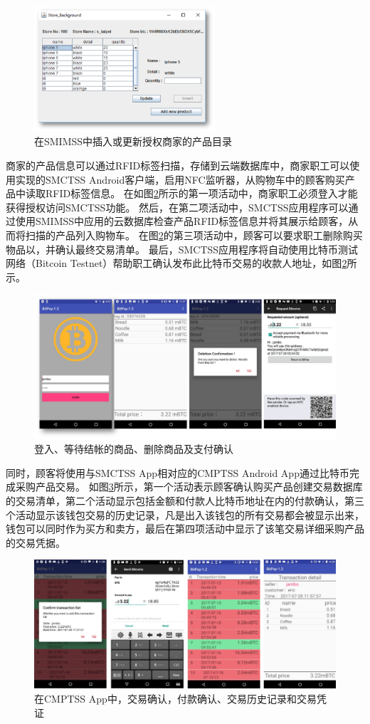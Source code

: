 \begin{figure}[!htbp]
	\centering
	\includegraphics[width = 0.6\textwidth]{fig6.png}
	\caption{在SMIMSS中插入或更新授权商家的产品目录}\label{fig6}
\end{figure}

商家的产品信息可以通过RFID标签扫描，存储到云端数据库中，商家职工可以使用实现的SMCTSS Android客户端，启用NFC监听器，从购物车中的顾客购买产品中读取RFID标签信息。 在如图\ref{fig7}所示的第一项活动中，商家职工必须登入才能获得授权访问SMCTSS功能。 然后，在第二项活动中，SMCTSS应用程序可以通过使用SMIMSS中应用的云数据库检查产品RFID标签信息并将其展示给顾客，从而将扫描的产品列入购物车。 在图\ref{fig7}的第三项活动中，顾客可以要求职工删除购买物品以，并确认最终交易清单。 最后，SMCTSS应用程序将自动使用比特币测试网络（Bitcoin Testnet）\supercite{bitcointestnet}帮助职工确认发布此比特币交易的收款人地址，如图\ref{fig7}所示。    

\begin{figure}[!htbp]
	\centering
	\includegraphics[width = 1\textwidth]{fig7.png}
	\caption{登入、等待结帐的商品、删除商品及支付确认}\label{fig7}
\end{figure}

同时，顾客将使用与SMCTSS App相对应的CMPTSS Android App通过比特币完成采购产品交易。 如图\ref{fig8}所示，第一个活动表示顾客确认购买产品创建交易数据库的交易清单，第二个活动显示包括金额和付款人比特币地址在内的付款确认，第三个活动显⽰该钱包交易的历史记录，凡是出入该钱包的所有交易都会被显示出来，
钱包可以同时作为买⽅和卖⽅，最后在第四项活动中显示了该笔交易详细采购产品的交易凭据。    

\begin{figure}[!htbp]
	\centering
	\includegraphics[width = 1\textwidth]{fig8.png}
	\caption{在CMPTSS App中，交易确认，付款确认、交易历史记录和交易凭证}\label{fig8}
\end{figure}